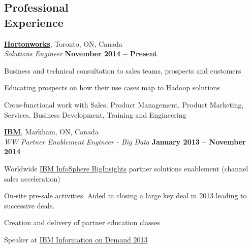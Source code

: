 \documentclass[margin,line]{resume}
\begin{document}
\begin{resume}
\section{\mysidestyle Professional\\Experience}


	\textbf{\href{http://hortonworks.com/}{Hortonworks}}, Toronto, ON, Canada					\vspace{2mm}\\\vspace{1mm}
	\textsl{Solutions Engineer}	\hfill\textbf{November 2014 -- Present}		\\\vspace{-3mm}
        \begin{list2}
                \item Business and technical consultation to sales teams, prospects and customers
                \item Educating prospects on how their use cases map to Hadoop solutions
                \item Cross-functional work with Sales, Product Management, Product Marketing, Services, Business Development, Training and Engineering
        \end{list2}

	\textbf{\href{http://www.ibm.com/}{IBM}}, Markham, ON, Canada					\vspace{2mm}\\\vspace{1mm}
	\textsl{WW Partner Enablement Engineer - Big Data}	\hfill\textbf{January 2013 -- November 2014}		\\\vspace{-3mm}
	\begin{list2}
		\item Worldwide \href{http://www.ibm.com/software/data/infosphere/biginsights}{IBM InfoSphere BigInsights} partner solutions enablement (channel sales acceleration)
		\item On-site pre-sale activities. Aided in closing a large key deal in 2013 leading to successive deals.
		\item Creation and delivery of partner education classes
		\item Speaker at \href{https://www-01.ibm.com/software/data/2013-conference/}{IBM Information on Demand 2013}
	\end{list2}


\end{resume}
\end{document}
